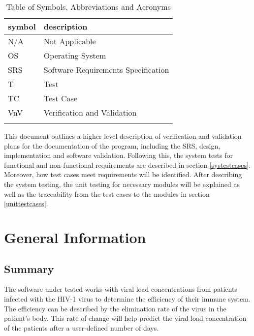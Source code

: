 \documentclass[12pt, titlepage]{article}
\begin{document}
\begin{table}[H]
\renewcommand{\arraystretch}{1.2}
\noindent \begin{longtable*}{l p{8cm}} \toprule
\textbf{symbol} & \textbf{description}\\
\midrule 
N/A & Not Applicable
\\
OS & Operating System
\\
SRS & Software Requirements Specification
\\
T & Test 
\\
TC & Test Case 
\\
VnV & Verification and Validation 
\\
&\\
\bottomrule

\end{longtable*}
\caption{Table of Symbols, Abbreviations and Acronyms}
\end{table}


\newpage


This document outlines a higher level description of verification and validation plans for the documentation of the \progname{} program, including the 
SRS, design, implementation and software validation. Following this, the system 
tests for functional and non-functional requirements are described in section \ref{systestcases}. Moreover, 
how test cases meet requirements will be identified. After describing the system 
testing, the unit testing for necessary modules will be 
explained as well as the traceability from the test cases to the modules in section \ref{unittestcases}.

\section{General Information}

\subsection{Summary}

The software under tested works with viral load concentrations from patients 
infected with the HIV-1 virus to determine the efficiency of their immune 
system. 
The efficiency can be described by the elimination rate of the virus in the 
patient's body.
This rate of change will help predict the viral load concentration of the 
patients after a user-defined number of days. 
\end{document}
